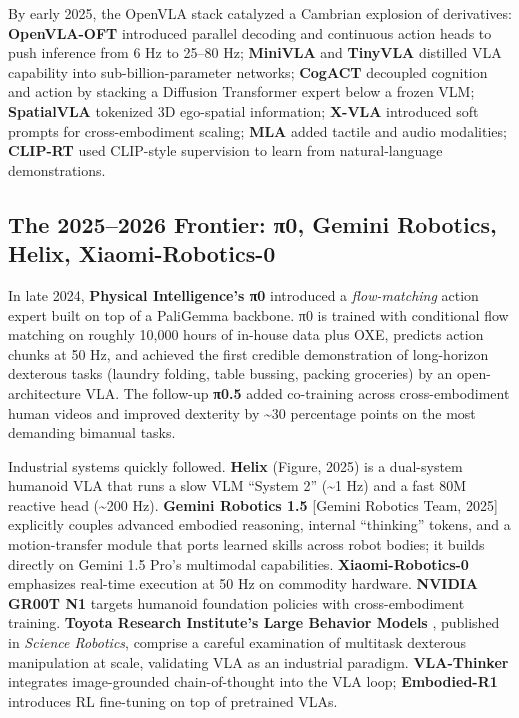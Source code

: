 \documentclass{article}
\begin{document}
By early 2025, the OpenVLA stack catalyzed a Cambrian explosion of derivatives: \textbf{OpenVLA-OFT} \cite{kim2025finetuningvisionla} introduced parallel decoding and continuous action heads to push inference from 6 Hz to 25--80 Hz; \textbf{MiniVLA} and \textbf{TinyVLA} distilled VLA capability into sub-billion-parameter networks; \textbf{CogACT} \cite{li2024cogactafoundationa} decoupled cognition and action by stacking a Diffusion Transformer expert below a frozen VLM; \textbf{SpatialVLA} \cite{qu2025spatialvlaexplorin} tokenized 3D ego-spatial information; \textbf{X-VLA} \cite{zheng2025xvlasoftpromptedtr} introduced soft prompts for cross-embodiment scaling; \textbf{MLA} \cite{liu2025mlaamultisensoryla} added tactile and audio modalities; \textbf{CLIP-RT} \cite{kang2025cliprtlearninglang} used CLIP-style supervision to learn from natural-language demonstrations.

\subsection{The 2025--2026 Frontier: π0, Gemini Robotics, Helix, Xiaomi-Robotics-0}\label{the-20252026-frontier-ux3c00-gemini-robotics-helix-xiaomi-robotics-0}

In late 2024, \textbf{Physical Intelligence's π0} \cite{black20240avisionlanguageac} introduced a \emph{flow-matching} action expert built on top of a PaliGemma backbone. π0 is trained with conditional flow matching on roughly 10,000 hours of in-house data plus OXE, predicts action chunks at 50 Hz, and achieved the first credible demonstration of long-horizon dexterous tasks (laundry folding, table bussing, packing groceries) by an open-architecture VLA. The follow-up \textbf{π0.5} added co-training across cross-embodiment human videos and improved dexterity by \textasciitilde30 percentage points on the most demanding bimanual tasks.

Industrial systems quickly followed. \textbf{Helix} (Figure, 2025) is a dual-system humanoid VLA that runs a slow VLM ``System 2'' (\textasciitilde1 Hz) and a fast 80M reactive head (\textasciitilde200 Hz). \textbf{Gemini Robotics 1.5} {[}Gemini Robotics Team, 2025{]} explicitly couples advanced embodied reasoning, internal ``thinking'' tokens, and a motion-transfer module that ports learned skills across robot bodies; it builds directly on Gemini 1.5 Pro's multimodal capabilities. \textbf{Xiaomi-Robotics-0} \cite{cai2026xiaomirobotics0ano} emphasizes real-time execution at 50 Hz on commodity hardware. \textbf{NVIDIA GR00T N1} targets humanoid foundation policies with cross-embodiment training. \textbf{Toyota Research Institute's Large Behavior Models} \cite{barreiros2026acarefulexaminatio}, published in \emph{Science Robotics}, comprise a careful examination of multitask dexterous manipulation at scale, validating VLA as an industrial paradigm. \textbf{VLA-Thinker} \cite{wang2026vlathinkerboosting} integrates image-grounded chain-of-thought into the VLA loop; \textbf{Embodied-R1} \cite{yuan2025embodiedr1reinforc} introduces RL fine-tuning on top of pretrained VLAs.
\end{document}
